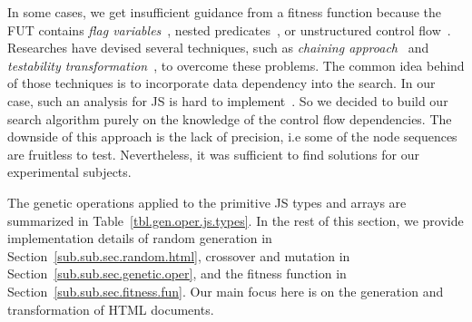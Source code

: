 In some cases, we get insufficient guidance from a fitness function because the FUT contains \emph{flag variables}~\cite{baresel2004evolutionary}, nested predicates~\cite{mcminn2005testability}, or unstructured control flow~\cite{hierons2005branch}. Researches have devised several techniques, such as \emph{chaining approach}~\cite{ferguson1996chaining,mcminn2006evolutionary} and \emph{testability transformation}~\cite{korel2005data}, to overcome these problems. The common idea behind of those techniques is to incorporate data dependency into the search. In our case, such an analysis for JS is hard to implement~\cite{jang2009points}. So we decided to build our search algorithm purely on the knowledge of the control flow dependencies. The downside of this approach is the lack of precision, i.e some of the node sequences are fruitless to test. Nevertheless, it was sufficient to find solutions for our experimental subjects.

The genetic operations applied to the primitive JS types and arrays are summarized in Table~\ref{tbl.gen.oper.js.types}. In the rest of this section, we provide implementation details of random generation in Section~\ref{sub.sub.sec.random.html}, crossover and mutation in Section~\ref{sub.sub.sec.genetic.oper}, and the fitness function in Section~\ref{sub.sub.sec.fitness.fun}. Our main focus here is on the generation and transformation of HTML documents.

